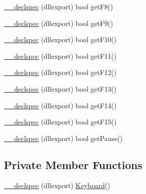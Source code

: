 \begin{DoxyCompactItemize}
\item 
\hyperlink{class_keyboard_a5513c8043b9af7e42642b5cd24c0c48d}{\-\_\-\-\_\-declspec} (dllexport) bool get\-F8()
\item 
\hyperlink{class_keyboard_a568cbb543f5821fcaeb40b2f255d77d0}{\-\_\-\-\_\-declspec} (dllexport) bool get\-F9()
\item 
\hyperlink{class_keyboard_a698b7a278e8bec634dc2361c58a61764}{\-\_\-\-\_\-declspec} (dllexport) bool get\-F10()
\item 
\hyperlink{class_keyboard_a927b06ef5dd5497a868cb943af14c785}{\-\_\-\-\_\-declspec} (dllexport) bool get\-F11()
\item 
\hyperlink{class_keyboard_a6334aa69c0055234325f808ec70dd763}{\-\_\-\-\_\-declspec} (dllexport) bool get\-F12()
\item 
\hyperlink{class_keyboard_a18e665443b2022592402371fbc66a461}{\-\_\-\-\_\-declspec} (dllexport) bool get\-F13()
\item 
\hyperlink{class_keyboard_a26bd57e52a961b24edfd8f4cc686aa99}{\-\_\-\-\_\-declspec} (dllexport) bool get\-F14()
\item 
\hyperlink{class_keyboard_ae3400e86b0d645430aaced4f4bd63ad3}{\-\_\-\-\_\-declspec} (dllexport) bool get\-F15()
\item 
\hyperlink{class_keyboard_a93e34ff6ca5af29e1388b84de0bc5f84}{\-\_\-\-\_\-declspec} (dllexport) bool get\-Pause()
\end{DoxyCompactItemize}
\subsection*{Private Member Functions}
\begin{DoxyCompactItemize}
\item 
\hyperlink{class_keyboard_a44c90d603b4ab9a455df4abb7aa4a54c}{\-\_\-\-\_\-declspec} (dllexport) \hyperlink{class_keyboard}{Keyboard}()
\end{DoxyCompactItemize}
